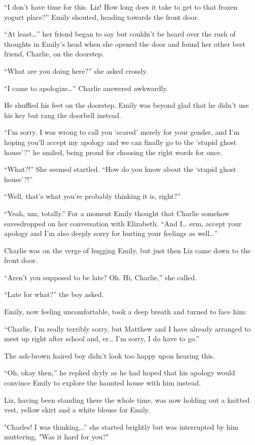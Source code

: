 “I don’t have time for this. Liz! How long does it take to get to that frozen yogurt place?” Emily shouted, heading towards the front door.

“At least…” her friend began to say but couldn’t be heard over the rush of thoughts in Emily’s head when she opened the door and found her other best friend, Charlie, on the doorstep.

“What are you doing here?” she asked crossly.

“I came to apologize…” Charlie answered awkwardly.

He shuffled his feet on the doorstep. Emily was beyond glad that he didn’t use his key but rang the doorbell instead.

“I’m sorry. I was wrong to call you ‘scared’ merely for your gender, and I’m hoping you’ll accept my apology and we can finally go to the ‘stupid ghost house’?” he smiled, being proud for choosing the right words for once.

“What?!” She seemed startled. “How do you know about the ‘stupid ghost house’?!”

“Well, that’s what you’re probably thinking it is, right?”

“Yeah, um, totally.” For a moment Emily thought that Charlie somehow eavesdropped on her conversation with Elizabeth. “And I… erm, accept your apology and I’m also deeply sorry for hurting your feelings as well…”

Charlie was on the verge of hugging Emily, but just then Liz came down to the front door.

“Aren’t you supposed to be late? Oh. Hi, Charlie,” she called.

“Late for what?” the boy asked.

Emily, now feeling uncomfortable, took a deep breath and turned to face him:

“Charlie, I’m really terribly sorry, but Matthew and I have already arranged to meet up right after school and, er… I’m sorry, I do have to go.”

The ash-brown haired boy didn’t look too happy upon hearing this.

“Oh, okay then,” he replied dryly as he had hoped that his apology would convince Emily to explore the haunted house with him instead.

Liz, having been standing there the whole time, was now holding out a knitted vest, yellow skirt and a white blouse for Emily.

"Charles! I was thinking...” she started brightly but was interrupted by him muttering, "Was it hard for you?"

